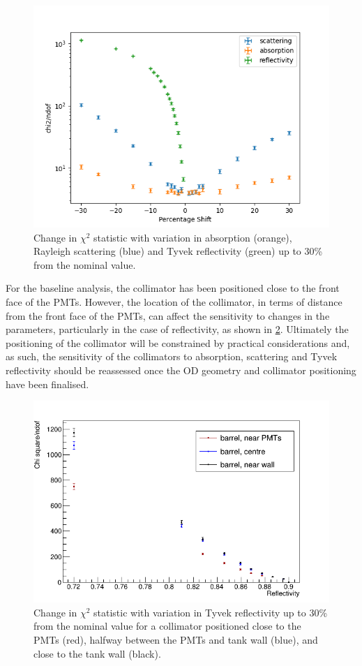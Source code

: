 \documentclass[a4paper,11pt]{article}
\begin{document}
\begin{figure}[ht!]
    \centering
    \includegraphics[width=0.5\linewidth]{params_plots_2.00.png}
    \caption{Change in $\chi^2$ statistic with variation in absorption (orange), Rayleigh scattering (blue) and Tyvek reflectivity (green) up to 30\% from the nominal value.}
    \label{fig:barrelAllParams}
\end{figure}

For the baseline analysis, the collimator has been positioned close to the front face of the PMTs. However, the location of the collimator, in terms of distance from the front face of the PMTs, can affect the sensitivity to changes in the parameters, particularly in the case of reflectivity, as shown in \cref{fig:refl_comparison_pmtdist.png}. Ultimately the positioning of the collimator will be constrained by practical considerations and, as such, the sensitivity of the collimators to absorption, scattering and Tyvek reflectivity should be reassessed once the OD geometry and collimator positioning have been finalised.

\begin{figure}[ht!]
    \centering
    \includegraphics[width=0.5\linewidth]{collimator_compare_positions_refl.png}
    \caption{Change in $\chi^2$ statistic with variation in Tyvek reflectivity up to 30\% from the nominal value for a collimator positioned close to the PMTs (red), halfway between the PMTs and tank wall (blue), and close to the tank wall (black).}
    \label{fig:refl_comparison_pmtdist.png}
\end{figure}
\end{document}
